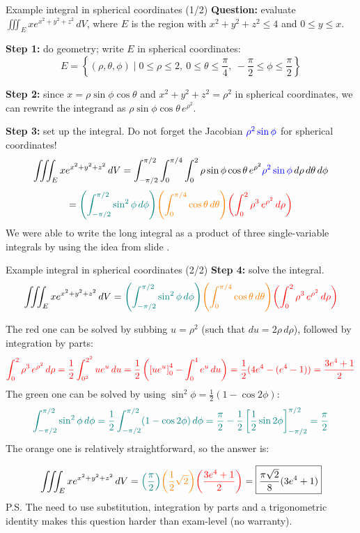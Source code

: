 \begin{frame}{Example integral in spherical coordinates (1/2)}
    \footnotesize
    \textbf{Question:} evaluate $\iiint_E xe^{x^2+y^2+z^2}\,dV$, where $E$ is the region with $x^2+y^2+z^2\leq4$ and $0\leq y\leq x$.

    \pause\textbf{Step 1:} do geometry; write $E$ in spherical coordinates:
    \[E=\left\{(\rho,\theta,\phi) \mid 0\leq\rho\leq2,~0\leq\theta\leq\frac{\pi}{4},~-\frac{\pi}{2}\leq\phi\leq\frac{\pi}{2}\right\}\]

    \pause\textbf{Step 2:} since $x=\rho\sin\phi\cos\theta$ and $x^2+y^2+z^2=\rho^2$ in spherical coordinates, we can rewrite the integrand as $\rho\sin\phi\cos\theta \,e^{\rho^2}$.

    \pause\textbf{Step 3:} set up the integral. Do not forget the Jacobian $\textcolor{blue}{\rho^2\sin\phi}$ for spherical coordinates!
    \[\iiint_E xe^{x^2+y^2+z^2}\,dV = \int_{-\pi/2}^{\pi/2}\int_0^{\pi/4}\int_0^2 \rho\sin\phi\cos\theta\,e^{\rho^2}\textcolor{blue}{\rho^2\sin\phi}\,d\rho\,d\theta\,d\phi\]
    \[=\textcolor{teal}{\left(\int_{-\pi/2}^{\pi/2}\sin^2\phi\,d\phi\right)}\textcolor{orange}{\left(\int_0^{\pi/4}\cos\theta\,d\theta\right)}\textcolor{red}{\left(\int_0^2\rho^3\,e^{\rho^2}\,d\rho\right)}
 \]
    We were able to write the long integral as a product of three single-variable integrals by using the idea from slide \blue{\ref{integraltrick}}.
\end{frame}

\begin{frame}{Example integral in spherical coordinates (2/2)}
    \footnotesize
    \textbf{Step 4:} solve the integral.
    \[
        \iiint_E xe^{x^2+y^2+z^2}\,dV =\textcolor{teal}{\left(\int_{-\pi/2}^{\pi/2}\sin^2\phi\,d\phi\right)}\textcolor{orange}{\left(\int_0^{\pi/4}\cos\theta\,d\theta\right)}\textcolor{red}{\left(\int_0^2\rho^3\,e^{\rho^2}\,d\rho\right)}
    \]

    \pause The red one can be solved by subbing $u=\rho^2$ (such that $du=2\rho \,d\rho$), followed by integration by parts:
    \[\textcolor{red}{\int_0^2\rho^3\,e^{\rho^2}\,d\rho=\frac{1}{2}\int_{0^2}^{2^2}ue^u\,du=\frac{1}{2}\left(\left[ue^u\right]_0^4-\int_0^4e^u\,du\right)=\frac{1}{2}(4e^4-(e^4-1))=\frac{3e^4+1}{2}}\]
    \pause The green one can be solved by using $\sin^2\phi=\frac{1}{2}\left(1-\cos2\phi\right)$:
    \[\textcolor{teal}{\int_{-\pi/2}^{\pi/2}\sin^2\phi\,d\phi=\frac{1}{2}\int_{-\pi/2}^{\pi/2}(1-\cos2\phi)\,d\phi=\frac{\pi}{2}-\frac{1}{2}\left[\frac{1}{2}\sin2\phi\right]_{-\pi/2}^{\pi/2}=\frac{\pi}{2}}\]
    \pause The orange one is relatively straightforward, so the answer is:

    \[
        \iiint_E xe^{x^2+y^2+z^2}\,dV =\textcolor{teal}{\left(\frac{\pi}{2}\right)}\textcolor{orange}{\left(\frac{1}{2}\sqrt{2}\right)}\textcolor{red}{\left(\frac{3e^4+1}{2}\right)}=\boxed{\frac{\pi\sqrt2}{8}(3e^4+1)}
    \]
\scriptsize    P.S. The need to use substitution, integration by parts and a trigonometric identity makes this question harder than exam-level (no warranty). 
\end{frame}
